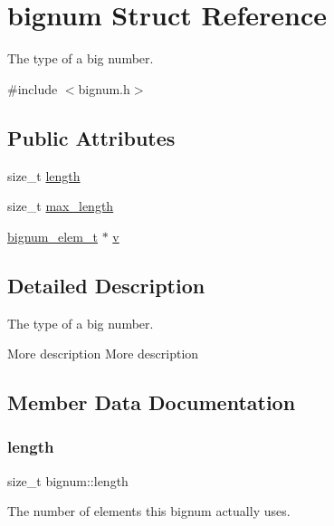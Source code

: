 \hypertarget{structbignum}{}\section{bignum Struct Reference}
\label{structbignum}


The type of a big number.  




{\ttfamily \#include $<$bignum.\+h$>$}

\subsection*{Public Attributes}
\begin{DoxyCompactItemize}
\item 
size\+\_\+t \hyperlink{structbignum_a5cec444ac0a9e7b44a073dbb0f0bf915}{length}
\item 
size\+\_\+t \hyperlink{structbignum_aca95f5f27d2bb952cb8a6f906a138e62}{max\+\_\+length}
\item 
\hyperlink{bignum_8h_ac19e9b7c8236cb1d9e8b4bf16d0ce513}{bignum\+\_\+elem\+\_\+t} $\ast$ \hyperlink{structbignum_a60955e5f7046ec12c4c292510ad18146}{v}
\end{DoxyCompactItemize}


\subsection{Detailed Description}
The type of a big number. 

More description More description 

\subsection{Member Data Documentation}
\mbox{\label{structbignum_a5cec444ac0a9e7b44a073dbb0f0bf915}} 
\subsubsection{\texorpdfstring{length}{length}}
{\footnotesize\ttfamily size\+\_\+t bignum\+::length}

The number of elements this bignum actually uses. \mbox{\label{structbignum_aca95f5f27d2bb952cb8a6f906a138e62}} 

